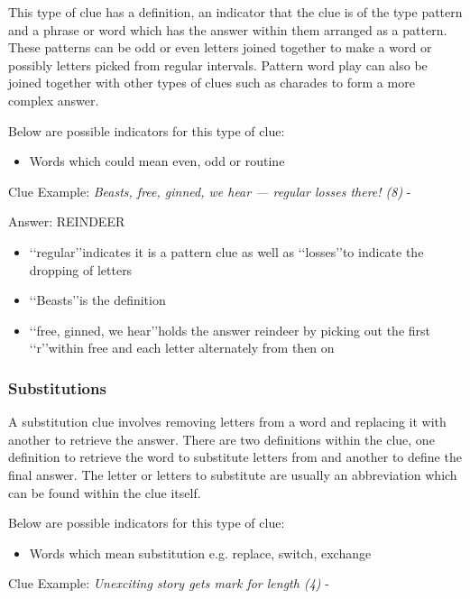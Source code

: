 This type of clue has a definition, an indicator that the clue is of the type pattern and a phrase or word which has the answer within them arranged as a pattern. These patterns can be odd or even letters joined together to make a word or possibly letters picked from regular intervals. Pattern word play can also be joined together with other types of clues such as charades to form a more complex answer. 

Below are possible indicators for this type of clue:
\begin{itemize} 
	\item Words which could mean even, odd or routine 
\\
\end{itemize}

Clue Example: \emph{Beasts, free, ginned, we hear — regular losses there! (8)} - \citep{shuchiPicking09}

Answer: REINDEER 

\begin{itemize}
	\item \lq\lq regular\rq\rq indicates it is a pattern clue as well as \lq\lq losses\rq\rq to indicate the dropping of letters 
	\item \lq\lq Beasts\rq\rq is the definition 
	\item \lq\lq free, ginned, we hear\rq\rq holds the answer reindeer by picking out the first \lq\lq r\rq\rq within free and each letter alternately from then on
\end{itemize} 

\subsubsection{Substitutions}

A substitution clue involves removing letters from a word and replacing it with another to retrieve the answer. There are two definitions within the clue, one definition to retrieve the word to substitute letters from and another to define the final answer. The letter or letters to substitute are usually an abbreviation which can be found within the clue itself. 

Below are possible indicators for this type of clue:
\begin{itemize} 
	\item Words which mean substitution e.g. replace, switch, exchange
\\
\end{itemize}

Clue Example: \emph{Unexciting story gets mark for length (4)} - \citep{shuchiSubstitutions08}

